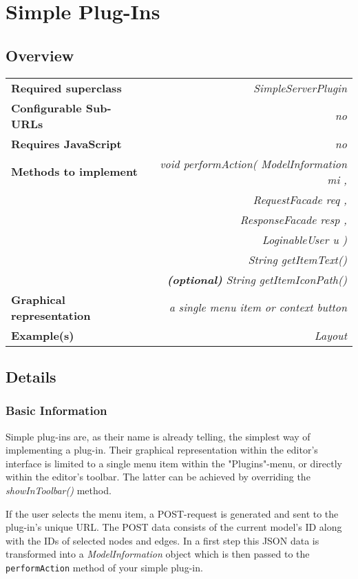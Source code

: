 \section{Simple Plug-Ins}
	\subsection{Overview}
		\begin{table}[ht]
			\centering
			\begin{tabular}{@{}lr@{}}
			\toprule
			\textbf{Required superclass} &
\textit{SimpleServerPlugin} \\
			\textbf{Configurable Sub-URLs} & \textit{no} \\
			\textbf{Requires JavaScript} & \textit{no} \\
			\textbf{Methods to implement} & \textit{void
performAction( ModelInformation mi , }\\
			& \textit{RequestFacade req , } \\
			& \textit{ResponseFacade resp , } \\
			& \textit{LoginableUser u )} \\
			\addlinespace
			& \textit{String getItemText()} \\
			\addlinespace
			& \textit{\textbf{(optional)} String
getItemIconPath()}\\
			\addlinespace
			\textbf{Graphical representation} & \textit{a single
menu item or context button} \\
			\textbf{Example(s)} & \textit{Layout} \\
			\bottomrule
			\end{tabular}
		\end{table}
	
	\subsection{Details}
		\subsubsection{Basic Information}
		Simple plug-ins are, as their name is already telling, the
simplest way of implementing a plug-in. Their graphical representation within
the editor's interface is limited to a single menu item within the
"Plugins"-menu, or directly within the editor's toolbar. The latter can be
achieved by overriding the \textit{showInToolbar()} method.
		
		If the user selects the menu item, a POST-request is generated
and sent to the plug-in's unique URL. The POST data consists of the current
model's ID along with the IDs of selected nodes and edges. In a first step this
JSON data is transformed into a \textit{ModelInformation} object which is then
passed to the \verb!performAction! method of your simple plug-in.
		
